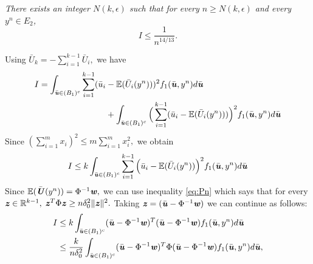\documentclass[11pt,onecolumn]{IEEEtran}
\def\mathbi#1{{\textbf{\textit #1}}}
\begin{document}
{\em There exists an integer $N(k,\epsilon)$ such that
for every $n\ge N(k,\epsilon)$ and every $y^n \in E_2$,
   \begin{equation}\label{eq:I}
I  
\le   \frac{1}{n^{14/13}}.
   \end{equation}
}

Using $\bar U_k=-\sum_{i=1}^{k-1} \bar U_{i},$ we have
\begin{align*}
I = \int_{\bar{\mathbi{u}} \in (B_1)^c} \sum_{i=1}^{k-1} (\bar{u}_i &- \mathbb{E}( \bar{U}_i(y^n) ) )^2 f_1(\bar{\mathbi{u}},y^n) d\bar{\mathbi{u}}\\
&+  \int_{\bar{\mathbi{u}} \in (B_1)^c}  \Big(\sum_{i=1}^{k-1}  (\bar{u}_i- \mathbb{E}( \bar{U}_i(y^n) )) \Big)^2 f_1(\bar{\mathbi{u}},y^n) d\bar{\mathbi{u}}
\end{align*}
Since $(\sum_{i=1}^m x_i)^2\le m\sum_{i=1}^m x_i^2,$ we obtain
  $$
  I\le k \int_{\bar{\mathbi{u}} \in (B_1)^c} \sum_{i=1}^{k-1} \Big(\bar{u}_i- \mathbb{E}( \bar{U}_i(y^n) ) \Big)^2 f_1(\bar{\mathbi{u}},y^n) d\bar{\mathbi{u}}
  $$ 
Since $\mathbb{E}(\bar{\mathbi{U}}(y^n))=\Phi^{-1}\mathbi{w},$ we can use inequality \eqref{eq:Pn} which says that for every $\mathbi{z}\in {\mathbb R}^{k-1},$ $\mathbi{z}^T\Phi \mathbi{z}\ge n\delta_0^2\|\mathbi{z}\|^2.$ Taking $\mathbi{z}=(\bar{\mathbi{u}} - \Phi^{-1}\mathbi{w})$ we can continue as follows:
  \begin{align}
I&\le   k
\int_{\bar{\mathbi{u}} \in (B_1)^c} (\bar{\mathbi{u}} - \Phi^{-1}\mathbi{w})^T  
(\bar{\mathbi{u}} - \Phi^{-1}\mathbi{w}) f_1(\bar{\mathbi{u}},y^n) d\bar{\mathbi{u}} \nonumber\\
&\le \frac{k}{n \delta_0^2}
\int_{\bar{\mathbi{u}} \in (B_1)^c} (\bar{\mathbi{u}} - \Phi^{-1}\mathbi{w})^T  \Phi
(\bar{\mathbi{u}} - \Phi^{-1}\mathbi{w}) f_1(\bar{\mathbi{u}},y^n) d\bar{\mathbi{u}}, \label{eq:100}
\end{align}
\end{document}
